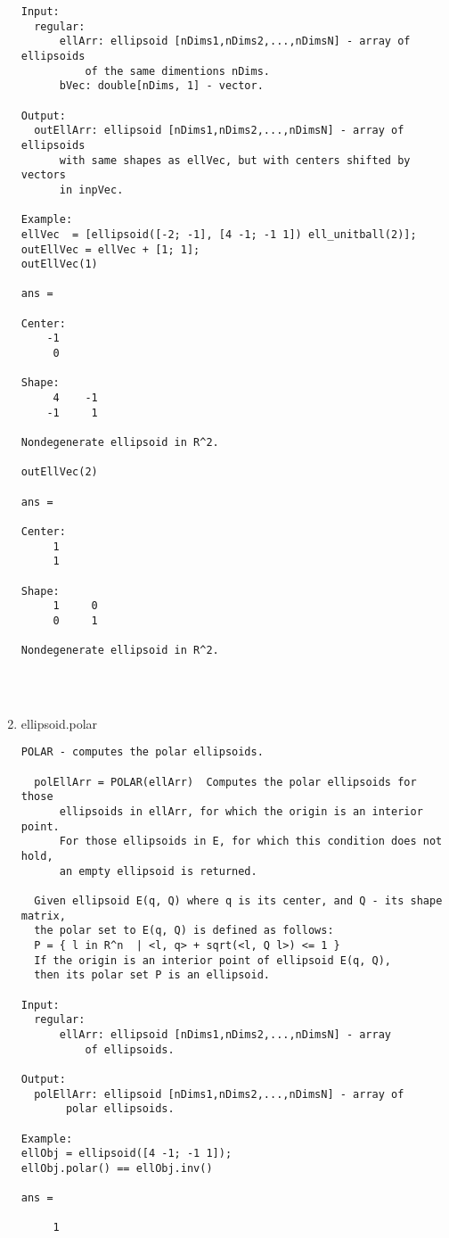 \begin{enumerate}
\begin{lstlisting}
Input:
  regular:
      ellArr: ellipsoid [nDims1,nDims2,...,nDimsN] - array of ellipsoids
          of the same dimentions nDims.
      bVec: double[nDims, 1] - vector.

Output:
  outEllArr: ellipsoid [nDims1,nDims2,...,nDimsN] - array of ellipsoids
      with same shapes as ellVec, but with centers shifted by vectors
      in inpVec.

Example:
ellVec  = [ellipsoid([-2; -1], [4 -1; -1 1]) ell_unitball(2)];
outEllVec = ellVec + [1; 1];
outEllVec(1)

ans =

Center:
    -1
     0

Shape:
     4    -1
    -1     1

Nondegenerate ellipsoid in R^2.

outEllVec(2)

ans =

Center:
     1
     1

Shape:
     1     0
     0     1

Nondegenerate ellipsoid in R^2.




\end{lstlisting}
\fontfamily{\familydefault}
\selectfont
\item {ellipsoid.polar}
\selectfont
\begin{lstlisting}
POLAR - computes the polar ellipsoids.

  polEllArr = POLAR(ellArr)  Computes the polar ellipsoids for those
      ellipsoids in ellArr, for which the origin is an interior point.
      For those ellipsoids in E, for which this condition does not hold,
      an empty ellipsoid is returned.

  Given ellipsoid E(q, Q) where q is its center, and Q - its shape matrix,
  the polar set to E(q, Q) is defined as follows:
  P = { l in R^n  | <l, q> + sqrt(<l, Q l>) <= 1 }
  If the origin is an interior point of ellipsoid E(q, Q),
  then its polar set P is an ellipsoid.

Input:
  regular:
      ellArr: ellipsoid [nDims1,nDims2,...,nDimsN] - array
          of ellipsoids.

Output:
  polEllArr: ellipsoid [nDims1,nDims2,...,nDimsN] - array of
       polar ellipsoids.

Example:
ellObj = ellipsoid([4 -1; -1 1]);
ellObj.polar() == ellObj.inv()

ans =

     1




\end{lstlisting}
\end{enumerate}
